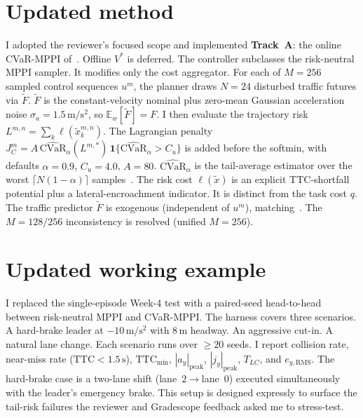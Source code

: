 \documentclass[letterpaper, 10 pt, conference]{ieeeconf}  %
\begin{document}
\section{Updated method}
I adopted the reviewer's focused scope and implemented \textbf{Track~A}: the online CVaR-MPPI of~\cite{ramppi}. Offline $V^{*}$ is deferred. The controller subclasses the risk-neutral MPPI sampler. It modifies only the cost aggregator. For each of $M\!=\!256$ sampled control sequences $u^{m}$, the planner draws $N\!=\!24$ disturbed traffic futures via $\tilde F$. $\tilde F$ is the constant-velocity nominal plus zero-mean Gaussian acceleration noise $\sigma_a\!=\!1.5\,\mathrm{m/s^2}$, so $\mathbb{E}_w[\tilde F]\!=\!F$. I then evaluate the trajectory risk $L^{m,n}\!=\!\sum_{k}\ell(\tilde x^{m,n}_k)$. The Lagrangian penalty $J_C^{m}\!=\!A\,\widehat{\mathrm{CVaR}}_\alpha(L^{m,*})\,\mathbf{1}\{\widehat{\mathrm{CVaR}}_\alpha\!>\!C_u\}$ is added before the softmin, with defaults $\alpha\!=\!0.9$, $C_u\!=\!4.0$, $A\!=\!80$. $\widehat{\mathrm{CVaR}}_\alpha$ is the tail-average estimator over the worst $\lceil N(1\!-\!\alpha)\rceil$ samples~\cite{rockafellar}. The risk cost $\ell(\tilde x)$ is an explicit TTC-shortfall potential plus a lateral-encroachment indicator. It is distinct from the task cost $q$. The traffic predictor $\tilde F$ is exogenous (independent of $u^{m}$), matching~\cite{ramppi}. The $M\!=\!128/256$ inconsistency is resolved (unified $M\!=\!256$).

\section{Updated working example}
I replaced the single-episode Week-4 test with a paired-seed head-to-head between risk-neutral MPPI and CVaR-MPPI\@. The harness covers three scenarios. A hard-brake leader at $-10\,\mathrm{m/s^2}$ with $8\,\mathrm{m}$ headway. An aggressive cut-in. A natural lane change. Each scenario runs over $\ge\!20$ seeds. I report collision rate, near-miss rate ($\mathrm{TTC}\!<\!1.5\,\mathrm{s}$), $\mathrm{TTC}_{\min}$, $|a_y|_{\mathrm{peak}}$, $|j_y|_{\mathrm{peak}}$, $T_{LC}$, and $e_{y,\mathrm{RMS}}$. The hard-brake case is a two-lane shift (lane~$2\!\to\!$lane~$0$) executed simultaneously with the leader's emergency brake. This setup is designed expressly to surface the tail-risk failures the reviewer and Gradescope feedback asked me to stress-test.
\end{document}
